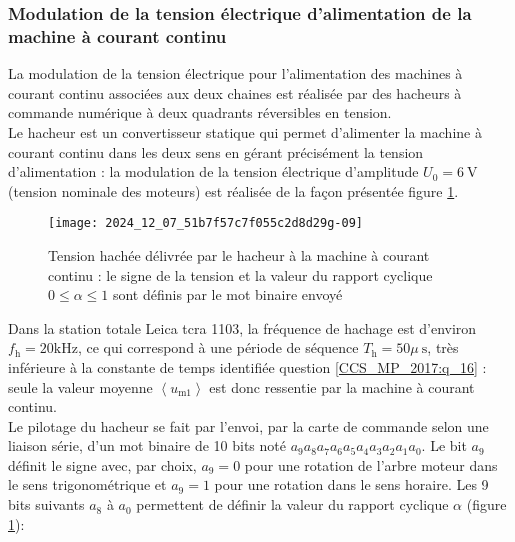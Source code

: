 \ifprof
\begin{corrige}
\end{corrige}
\else
\fi


\subsubsection{ Modulation de la tension électrique d'alimentation de la machine à courant continu}
La modulation de la tension électrique pour l'alimentation des machines à courant continu associées aux deux chaines est réalisée par des hacheurs à commande numérique à deux quadrants réversibles en tension.\\
Le hacheur est un convertisseur statique qui permet d'alimenter la machine à courant continu dans les deux sens en gérant précisément la tension d'alimentation : la modulation de la tension électrique d'amplitude $U_{0}=6 \mathrm{~V}$ (tension nominale des moteurs) est réalisée de la façon présentée figure \ref{CCS_MP_2017:fig_13}.\\

\begin{figure}[!h]
\centering
\texttt{[image: 2024\_12\_07\_51b7f57c7f055c2d8d29g-09]}

\caption{Tension hachée délivrée par le hacheur à la machine à courant continu : le signe de la tension et la valeur du rapport cyclique $0 \leqslant \alpha \leqslant 1$ sont définis par le mot binaire envoyé \label{CCS_MP_2017:fig_13}}
\end{figure}

Dans la station totale Leica tcra 1103, la fréquence de hachage est d'environ $f_{\mathrm{h}}=20 \mathrm{kHz}$, ce qui correspond à une période de séquence $T_{\mathrm{h}}=50 \mu \mathrm{~s}$, très inférieure à la constante de temps identifiée question \ref{CCS_MP_2017:q_16}  : seule la valeur moyenne $\left\langle u_{\mathrm{m} 1}\right\rangle$ est donc ressentie par la machine à courant continu.\\
Le pilotage du hacheur se fait par l'envoi, par la carte de commande selon une liaison série, d'un mot binaire de 10 bits noté $a_{9} a_{8} a_{7} a_{6} a_{5} a_{4} a_{3} a_{2} a_{1} a_{0}$. Le bit $a_{9}$ définit le signe avec, par choix, $a_{9}=0$ pour une rotation de l'arbre moteur dans le sens trigonométrique et $a_{9}=1$ pour une rotation dans le sens horaire. Les 9 bits suivants $a_{8}$ à $a_{0}$ permettent de définir la valeur du rapport cyclique $\alpha$ (figure \ref{CCS_MP_2017:fig_13}):

